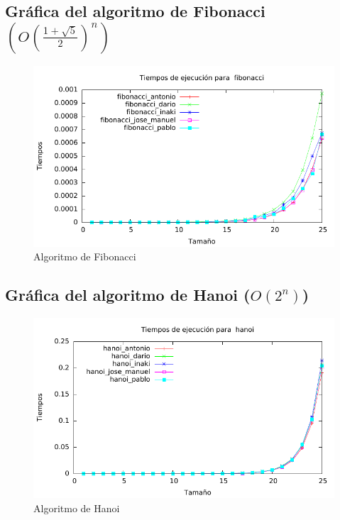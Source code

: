 \documentclass[a4paper, 11pt]{article}
\begin{document}
\subsection{Gráfica del algoritmo de Fibonacci $(O(\frac{1+\sqrt{5}}{2})^n)$}
\begin{figure}[h] \includegraphics[width=13cm]{fibonacci_todos_g} \centering
	\caption{Algoritmo de Fibonacci} \end{figure}

\newpage
\subsection{Gráfica del algoritmo de Hanoi ($O(2^n)$)}
\begin{figure}[h] \includegraphics[width=13cm]{hanoi_todos_g} \centering
	\caption{Algoritmo de Hanoi} \end{figure}
\end{document}
